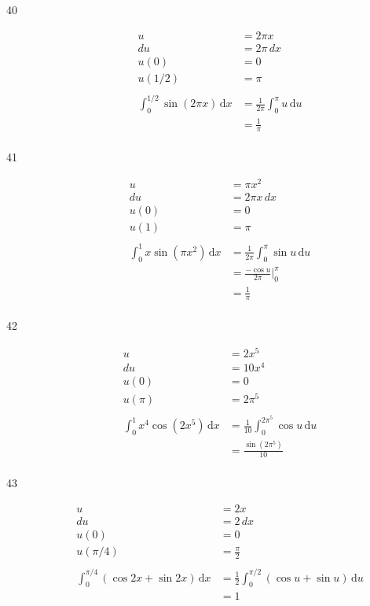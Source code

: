 \documentclass{exam}
\begin{document}
\begin{description}
\item[40]
\begin{align*}
  u &= 2 \pi x \\
  du &= 2 \pi \, dx \\
  u(0) &= 0 \\
  u(1/2) &= \pi \\
\\
  \int_0^{1/2} \sin(2 \pi x) \, \mathrm{d}x &= \frac{1}{2 \pi} \int_0^{\pi} u \, \mathrm{d}u \\
  &= \frac{1}{\pi} \\
\end{align*}

\item[41]
\begin{align*}
  u &= \pi x^2 \\
  du &= 2 \pi x \, dx \\
  u(0) &= 0 \\
  u(1) &= \pi \\
\\
  \int_0^{1} x \sin(\pi x^2) \, \mathrm{d}x &= \frac{1}{2 \pi} \int_0^{\pi} \sin u \, \mathrm{d}u \\
  &= \frac{- \cos u}{2 \pi} \bigg|_0^{\pi} \\
  &= \frac{1}{\pi} \\
\end{align*}

\item[42]
\begin{align*}
  u &= 2 x^5 \\
  du &= 10 x^4 \\
  u(0) &= 0 \\
  u(\pi) &= 2 \pi^5 \\
\\
  \int_0^{1} x^4 \cos(2 x^5) \, \mathrm{d}x &= \frac{1}{10} \int_0^{2 \pi^5} \cos u \, \mathrm{d}u \\
  &= \frac{\sin(2 \pi^5)}{10} \\
\end{align*}

\item[43]
\begin{align*}
  u &= 2x \\
  du &= 2 \, dx \\
  u(0) &= 0 \\
  u(\pi/4) &= \frac{\pi}{2} \\
\\
  \int_0^{\pi/4} (\cos 2x + \sin 2x) \, \mathrm{d}x &= \frac{1}{2} \int_0^{\pi/2} (\cos u + \sin u) \, \mathrm{d}u \\
  &= 1 \\
\end{align*}


\end{description}
\end{document}

